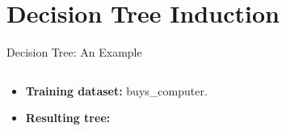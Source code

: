 \section{Decision Tree Induction}

\begin{frame}{Decision Tree: An Example}
	\vspace*{0.5cm}
	\begin{columns}
		\begin{column}{0.35\textwidth}
			\vspace{0cm}
			\begin{itemize}
				\item \textbf{Training dataset:} buys\_computer.
				\item \textbf{Resulting tree:}\\[0.1cm]
			\end{itemize}
			\centering
			\scalebox{0.9}{
				
			}
		\end{column}
		\begin{column}{0.55\textwidth}
			\vspace*{-1cm}
			\begin{center}
				\scalebox{0.8}{
					
				}
			\end{center}
		\end{column}
	\end{columns}
\end{frame}


